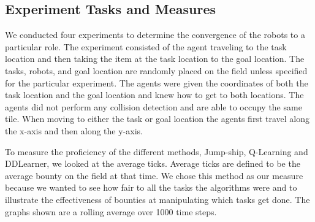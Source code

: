 \documentclass[twocolumn]{article}
\begin{document}


\subsection{Experiment Tasks and Measures}
We conducted four experiments to determine the convergence of the robots to a particular role.  The experiment consisted of the agent traveling to the task location and then taking the item at the task location to the goal location.  The tasks, robots, and goal location are randomly placed on the field unless specified for the particular experiment.  The agents were given the coordinates of both the task location and the goal location and knew how to get to both locations.  The agents did not perform any collision detection and are able to occupy the same tile.  When moving to either the task or goal location the agents first travel along the x-axis and then along the y-axis.

To measure the proficiency of the different methods, Jump-ship, Q-Learning and DDLearner, we looked at the average ticks.  Average ticks are defined to be the average bounty on the field at that time.  We chose this method as our measure because we wanted to see how fair to all the tasks the algorithms were and to illustrate the effectiveness of bounties at manipulating which tasks get done.  The graphs shown are a rolling average over 1000 time steps. 
\end{document}
